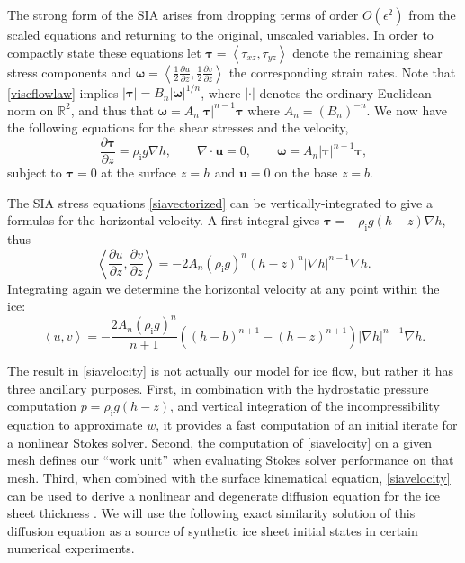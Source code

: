 \documentclass[letterpaper,final,12pt,reqno]{amsart}
\newcommand{\eps}{\epsilon}
\newcommand{\RR}{\mathbb{R}}
\newcommand{\grad}{\nabla}
\newcommand{\Div}{\nabla\cdot}
\newcommand{\bu}{\mathbf{u}}
\newcommand{\rhoi}{\rho_{\text{i}}}
\begin{document}
The strong form of the SIA arises from dropping terms of order $O(\eps^2)$ from the scaled equations and returning to the original, unscaled variables.  In order to compactly state these equations let $\bm{\tau}=\left<\tau_{xz},\tau_{yz}\right>$ denote the remaining shear stress components and $\bm{\omega}=\left<\frac{1}{2} \frac{\partial u}{\partial z},\frac{1}{2} \frac{\partial v}{\partial z}\right>$ the corresponding strain rates.  Note that \eqref{viscflowlaw} implies $|\bm{\tau}|=B_n |\bm{\omega}|^{1/n}$, where $|\cdot|$ denotes the ordinary Euclidean norm on $\RR^2$, and thus that $\bm{\omega} = A_n |\bm{\tau}|^{n-1} \bm{\tau}$ where $A_n=(B_n)^{-n}$.  We now have the following equations for the shear stresses and the velocity,
\begin{equation}
\frac{\partial\bm{\tau}}{\partial z} = \rhoi g \grad h, \qquad \Div \bu = 0, \qquad \bm{\omega} = A_n |\bm{\tau}|^{n-1} \bm{\tau}, \label{siavectorized}
\end{equation}
subject to $\bm{\tau}=0$ at the surface $z=h$ and $\bu=0$ on the base $z=b$.

The SIA stress equations \eqref{siavectorized} can be vertically-integrated to give a formulas for the horizontal velocity.  A first integral gives $\bm{\tau} = - \rhoi g (h-z) \grad h$, thus
    $$\left<\frac{\partial u}{\partial z},\frac{\partial v}{\partial z}\right> = - 2 A_n (\rhoi g)^n (h-z)^n |\grad h|^{n-1} \grad h.$$
Integrating again we determine the horizontal velocity at any point within the ice:
\begin{equation}
\left<u,v\right> = - \frac{2 A_n (\rhoi g)^n}{n+1} \left((h-b)^{n+1} - (h-z)^{n+1}\right) |\grad h|^{n-1} \grad h.  \label{siavelocity}
\end{equation}

The result in \eqref{siavelocity} is not actually our model for ice flow, but rather it has three ancillary purposes.  First, in combination with the hydrostatic pressure computation $p=\rhoi g (h-z)$, and vertical integration of the incompressibility equation to approximate $w$, it provides a fast computation of an initial iterate for a nonlinear Stokes solver.  Second, the computation of \eqref{siavelocity} on a given mesh defines our ``work unit'' when evaluating Stokes solver performance on that mesh.  Third, when combined with the surface kinematical equation, \eqref{siavelocity} can be used to derive a nonlinear and degenerate diffusion equation for the ice sheet thickness \cite{Fowler1997}.  We will use the following exact similarity solution of this diffusion equation as a source of synthetic ice sheet initial states in certain numerical experiments.
\end{document}
